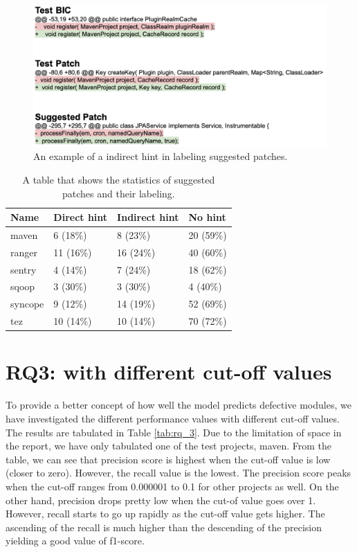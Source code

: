 \begin{figure}[!tbp]
\renewcommand{\arraystretch}{1}
    \centering
    \includegraphics[width=\textwidth]{figures/indirect_hint.png}\hfill
    \caption{An example of a indirect hint in labeling suggested patches.}
    \label{fig:indirect_hint}
\end{figure}

\begin{table}[!htp]
\centering
\caption{A table that shows the statistics of suggested patches and their labeling.}
\begin{tabular}{|l|l|l|l|}
\hline
{Name} & {Direct hint} & {Indirect hint} & {No hint} \\ \hline
{maven} & 6 (18\%) & 8 (23\%) & 20 (59\%) \\ \hline
{ranger} & 11 (16\%) & 16 (24\%) & 40 (60\%) \\ \hline
{sentry} & 4 (14\%) & 7 (24\%) & 18 (62\%) \\ \hline
{sqoop} & 3 (30\%) & 3 (30\%) & 4 (40\%) \\ \hline
{syncope} & 9 (12\%) & 14 (19\%) & 52 (69\%) \\ \hline
{tez} & 10 (14\%) & 10 (14\%) & 70 (72\%) \\ \hline
\end{tabular}%
\label{tab:rq_2}
\end{table}


\section{RQ3: {\simfinmo} with different cut-off values}
To provide a better concept of how well the model {\simfinmo} predicts defective modules, we have investigated the different performance values with different cut-off values.
The results are tabulated in Table \ref{tab:rq_3}.
Due to the limitation of space in the report, we have only tabulated one of the test projects, maven.
From the table, we can see that precision score is highest when the cut-off value is low (closer to zero).
However, the recall value is the lowest.
The precision score peaks when the cut-off ranges from 0.000001 to 0.1 for other projects as well.
On the other hand, precision drops pretty low when the cut-of value goes over 1.
However, recall starts to go up rapidly as the cut-off value gets higher.
The ascending of the recall is much higher than the descending of the precision yielding a good value of f1-score. 

